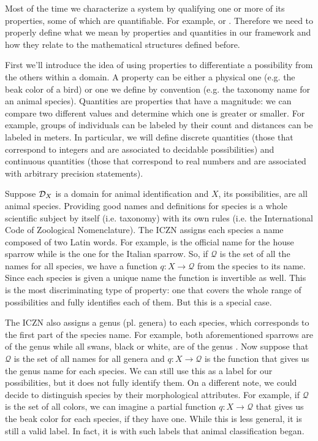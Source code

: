 \documentclass[11pt,letterpaper,fleqn]{memoir} %
\begin{document}
Most of the time we characterize a system by qualifying one or more of its properties, some of which are quantifiable. For example,  or . Therefore we need to properly define what we mean by properties and quantities in our framework and how they relate to the mathematical structures defined before.

First we'll introduce the idea of using properties to differentiate a possibility from the others within a domain. A property can be either a physical one (e.g. the beak color of a bird) or one we define by convention (e.g. the taxonomy name for an animal species). Quantities are properties that have a magnitude: we can compare two different values and determine which one is greater or smaller. For example, groups of individuals can be labeled by their count and distances can be labeled in meters. In particular, we will define discrete quantities (those that correspond to integers and are associated to decidable possibilities) and continuous quantities (those that correspond to real numbers and are associated with arbitrary precision statements).

Suppose $\mathcal{D}_X$ is a domain for animal identification and $X$, its possibilities, are all animal species. Providing good names and definitions for species is a whole scientific subject by itself (i.e. taxonomy) with its own rules (i.e. the International Code of Zoological Nomenclature). The ICZN assigns each species a name composed of two Latin words. For example,  is the official name for the house sparrow while  is the one for the Italian sparrow. So, if $\mathcal{Q}$ is the set of all the names for all species, we have a function $q: X \to \mathcal{Q}$ from the species to its name. Since each species is given a unique name the function is invertible as well. This is the most discriminating type of property: one that covers the whole range of possibilities and fully identifies each of them. But this is a special case.

The ICZN also assigns a genus (pl. genera) to each species, which corresponds to the first part of the species name. For example, both aforementioned sparrows are of the genus  while all swans, black or white, are of the genus . Now suppose that $\mathcal{Q}$ is the set of all names for all genera and $q: X \to \mathcal{Q}$ is the function that gives us the genus name for each species. We can still use this as a label for our possibilities, but it does not fully identify them. On a different note, we could decide to distinguish species by their morphological attributes. For example, if $\mathcal{Q}$ is the set of all colors, we can imagine a partial function $q: X \to \mathcal{Q}$ that gives us the beak color for each species, if they have one. While this is less general, it is still a valid label. In fact, it is with such labels that animal classification began.
\end{document}
